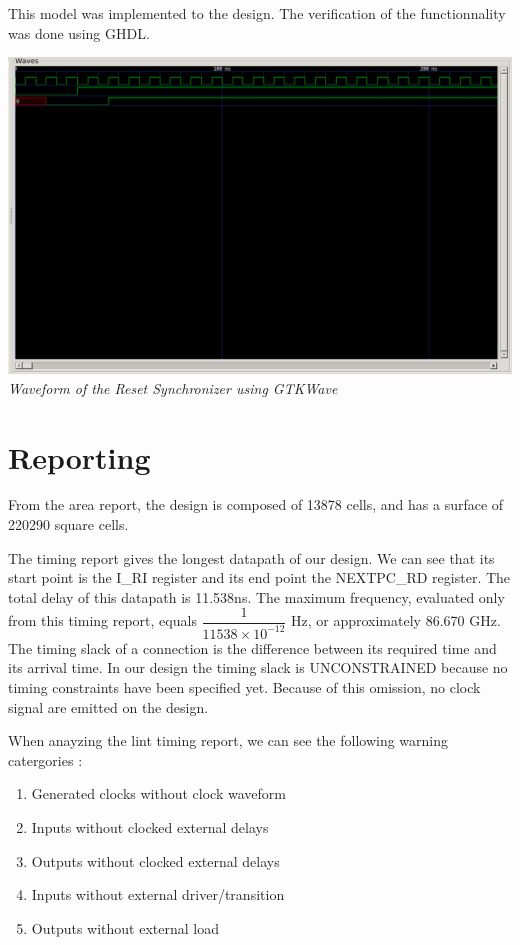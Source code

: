 \documentclass[a4paper]{article}
\begin{document}
This model was implemented to the design. The verification of the functionnality was done using GHDL.
\begin{center}
  \includegraphics[width=15cm]{./reset_sync_waveform.png}\\
  {\it Waveform of the Reset Synchronizer using GTKWave}
\end{center}

\newpage


\newpage

\section{Reporting}
From the area report, the design is composed of 13878 cells, and has a surface of 220290 square cells.

The timing report gives the longest datapath of our design. We can see that its start point is the I\_RI register
and its end point the NEXTPC\_RD register. The total delay of this datapath is 11.538ns.
The maximum frequency, evaluated only from this timing report, equals $\dfrac{1}{11538\times10^{-12}}$ Hz, or
approximately 86.670 GHz.
The timing slack of a connection is the difference between its required time and its arrival time. In our design
the timing slack is UNCONSTRAINED because no timing constraints have been specified yet. Because of this omission,
no clock signal are emitted on the design.

When anayzing the lint timing report, we can see the following warning catergories :
\begin{enumerate}
  \item Generated clocks without clock waveform
  \item Inputs without clocked external delays
  \item Outputs without clocked external delays
  \item Inputs without external driver/transition
  \item Outputs without external load
\end{enumerate}
\end{document}

